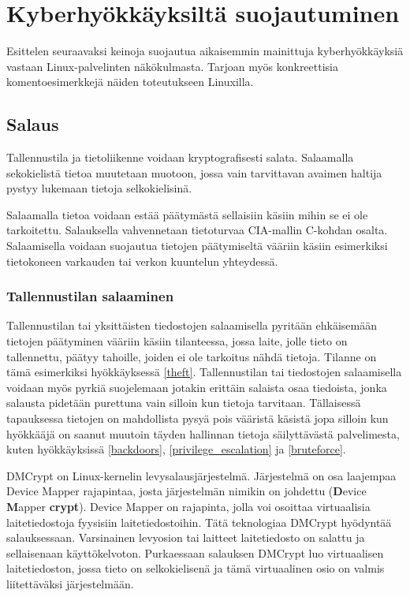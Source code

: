 \chapter{Kyberhyökkäyksiltä suojautuminen}\label{suojautuminen}

Esittelen seuraavaksi keinoja suojautua aikaisemmin mainittuja kyberhyökkäyksiä vastaan Linux-palvelinten näkökulmasta. Tarjoan myös konkreettisia komentoesimerkkejä näiden toteutukseen Linuxilla.

\section{Salaus}\label{Salaus}
Tallennustila ja tietoliikenne voidaan kryptografisesti salata. Salaamalla sekokielistä tietoa muutetaan muotoon, jossa vain tarvittavan avaimen haltija pystyy lukemaan tietoja selkokielisinä.

Salaamalla tietoa voidaan estää päätymästä sellaisiin käsiin mihin se ei ole tarkoitettu. Salauksella vahvennetaan tietoturvaa CIA-mallin C-kohdan osalta. Salaamisella voidaan suojautua tietojen päätymiseltä vääriin käsiin esimerkiksi tietokoneen varkauden tai verkon kuuntelun yhteydessä.~\cite{stamp2011information}

\subsection{Tallennustilan salaaminen}\label{tallennustilan_salaaminen}
Tallennustilan tai yksittäisten tiedostojen salaamisella pyritään ehkäisemään tietojen päätyminen vääriin käsiin tilanteessa, jossa laite, jolle tieto on tallennettu, päätyy tahoille, joiden ei ole tarkoitus nähdä tietoja. Tilanne on tämä esimerkiksi hyökkäyksessä \ref{theft}. Tallennustilan tai tiedostojen salaamisella voidaan myös pyrkiä suojelemaan jotakin erittäin salaista osaa tiedoista, jonka salausta pidetään purettuna vain silloin kun tietoja tarvitaan. Tällaisessä tapauksessa tietojen on mahdollista pysyä pois vääristä käsistä jopa silloin kun hyökkääjä on saanut muutoin täyden hallinnan tietoja säilyttävästä palvelimesta, kuten hyökkäyksissä \ref{backdoors}, \ref{privilege_escalation} ja \ref{bruteforce}.~\cite{stamp2011information}

DMCrypt on Linux-kernelin levysalausjärjestelmä. Järjestelmä on osa laajempaa Device Mapper rajapintaa, josta järjestelmän nimikin on johdettu (\textbf{D}evice \textbf{M}apper \textbf{crypt}). Device Mapper on rajapinta, jolla voi osoittaa virtuaalisia laitetiedostoja fyysisiin laitetiedostoihin. Tätä teknologiaa DMCrypt hyödyntää salauksessaan. Varsinainen levyosion tai laitteet laitetiedosto on salattu ja sellaisenaan käyttökelvoton. Purkaessaan salauksen DMCrypt luo virtuaalisen laitetiedoston, jossa tieto on selkokielisenä ja tämä virtuaalinen osio on valmis liitettäväksi järjestelmään.

